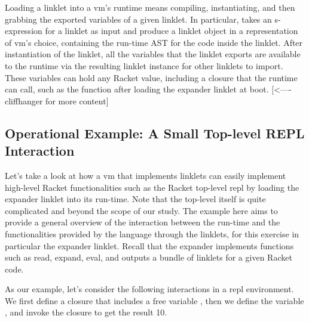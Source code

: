 		\begin{paragraph-here}
			Loading a linklet into a \gls{vm}'s runtime means compiling, instantiating, and then grabbing the exported variables of a given linklet. In particular,  takes an s-expression for a linklet as input and produce a linklet object in a representation of \gls{vm}'s choice, containing the run-time AST for the code inside the linklet. After instantiation of the linklet, all the variables that the linklet exports are available to the runtime via the resulting linklet instance for other linklets to import. These variables can hold any Racket value, including a closure that the runtime can call, such as the  function after loading the expander linklet at boot.  [<---- cliffhanger for more content]
		\end{paragraph-here}

		\subsection{Operational Example: A Small Top-level REPL Interaction}

		\begin{paragraph-here}
			Let’s take a look at how a \gls{vm} that implements linklets can easily implement high-level Racket functionalities such as the Racket top-level \gls{repl} by loading the expander linklet into its run-time. Note that the top-level itself is quite complicated and beyond the scope of our study. The example here aims to provide a general overview of the interaction between the run-time and the functionalities provided by the language through the linklets, for this exercise in particular the expander linklet. Recall that the expander implements functions such as read, expand, eval, and outputs a bundle of linklets for a given Racket code.
		\end{paragraph-here}

		\begin{paragraph-here}
			As our example, let’s consider the following interactions in a \gls{repl} environment. We first define a closure  that includes a free variable , then we define the variable , and invoke the closure to get the result 10.
		\end{paragraph-here}


